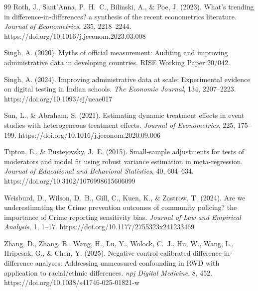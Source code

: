 \documentclass[12pt]{article}
\theoremstyle{definition}
\numberwithin{equation}{section}
\begin{document}
\begin{thebibliography}{99}
 Roth, J., Sant'Anna, P.~H.~C., Bilinski, A., \& Poe, J. (2023). What's trending in difference-in-differences? a synthesis of the recent econometrics literature. \emph{Journal of Econometrics}, 235, 2218--2244. https://doi.org/10.1016/j.jeconom.2023.03.008

 Singh, A. (2020). Myths of official measurement: Auditing and improving administrative data in developing countries. RISE Working Paper 20/042.

 Singh, A. (2024). Improving administrative data at scale: Experimental evidence on digital testing in Indian schools. \emph{The Economic Journal}, 134, 2207--2223. https://doi.org/10.1093/ej/ueae017

 Sun, L., \& Abraham, S. (2021). Estimating dynamic treatment effects in event studies with heterogeneous treatment effects. \emph{Journal of Econometrics}, 225, 175--199. https://doi.org/10.1016/j.jeconom.2020.09.006

 Tipton, E., \& Pustejovsky, J.~E. (2015). Small-sample adjustments for tests of moderators and model fit using robust variance estimation in meta-regression. \emph{Journal of Educational and Behavioral Statistics}, 40, 604--634. https://doi.org/10.3102/1076998615606099

 Weisburd, D., Wilson, D.~B., Gill, C., Kuen, K., \& Zastrow, T. (2024). Are we underestimating the Crime prevention outcomes of community policing? the importance of Crime reporting sensitivity bias. \emph{Journal of Law and Empirical Analysis}, 1, 1--17. https://doi.org/10.1177/2755323x241233469

 Zhang, D., Zhang, B., Wang, H., Lu, Y., Wolock, C.~J., Hu, W., Wang, L., Hripcsak, G., \& Chen, Y. (2025). Negative control-calibrated difference-in-difference analyses: Addressing unmeasured confounding in RWD with application to racial/ethnic differences. \emph{npj Digital Medicine}, 8, 452. https://doi.org/10.1038/s41746-025-01821-w

\end{thebibliography}
\end{document}
